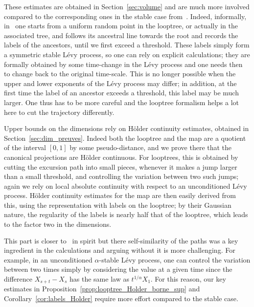 \documentclass[british, a4paper,11pt]{article}
\numberwithin{equation}{section}
\theoremstyle{definition}
\begin{document}
These estimates are obtained in Section~\ref{sec:volume} and are much more involved compared to the corresponding ones in the stable case from~\cite{LGM11, CK14}.
Indeed, informally, in~\cite{LGM11} one starts from a uniform random point in the looptree, or actually in the associated tree, and follows its ancestral line towards the root and records the labels of the ancestors, until we first exceed a threshold.
These labels simply form a symmetric stable L\'evy process, so one can rely on explicit calculations; they are formally obtained by some time-change in the L\'evy process and one needs then to change back to the original time-scale.
This is no longer possible when the upper and lower exponents of the L\'evy process may differ; in addition, at the first time the label of an ancestor exceeds a threshold, this label may be much larger.
One thus has to be more careful and the looptree formalism helps a lot here to cut the trajectory differently.

Upper bounds on the dimensions rely on H\"older continuity estimates, obtained in Section~\ref{sec:dim_preuves}.
Indeed both the looptree and the map are a quotient of the interval $[0,1]$ by some pseudo-distance, and we prove there that the canonical projections are H\"older continuous.
For looptrees, this is obtained by cutting the excursion path into small pieces, whenever it makes a jump larger than a small threshold, and controlling the variation between two such jumps; again we rely on local absolute continuity with respect to an unconditioned L\'evy process. 
H\"older continuity estimates for the map are then easily derived from this, using the representation with labels on the looptree; by their Gaussian nature, the regularity of the labels is nearly half that of the looptree, which leads to the factor two in the dimensions.

This part is closer to~\cite{LGM11, CK14} in spirit but there self-similarity of the paths was a key ingredient in the calculations and arguing without it is more challenging. For example, in an unconditioned $\alpha$-stable L\'evy process, one can control the variation between two times simply by considering the value at a given time since the difference $X_{s+t}-X_{s}$ has the same law as $t^{1/\alpha} X_1$.
For this reason, our key estimates in Proposition~\ref{prop:looptree_Holder_borne_sup} and Corollary~\ref{cor:labels_Holder} require  more effort compared to the stable case.
\end{document}
